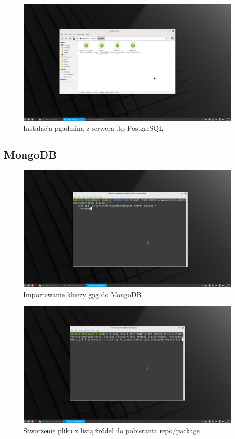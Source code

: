 \documentclass[11pt]{article}
\begin{document}
\newpage
		\begin{figure}[!ht]
			\includegraphics[width=\textwidth]{3_instalacja_pgadmin_wiem_co_robie.png}
			\caption{Instalacja pgadmina z serwera ftp PostgreSQL}
		\end{figure}

\newpage
	\subsection{MongoDB}
		\begin{figure}[!ht]
			\includegraphics[width=\textwidth]{4_importowanie_klucza_gpg.png}
			\caption{Importowanie kluczy gpg do MongoDB}
		\end{figure}
		\begin{figure}[!ht]
			\includegraphics[width=\textwidth]{5_tworzenie_pliku_z_listami_source_do_repo.png}
			\caption{Stworzenie pliku z listą źródeł do pobierania repo/package}
		\end{figure}
\end{document}

